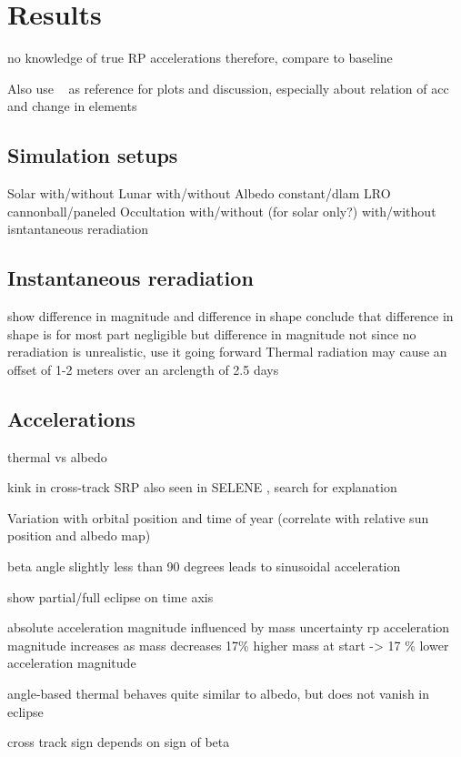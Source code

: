 \section{Results}

no knowledge of true RP accelerations
therefore, compare to baseline

Also use ~\cite{Borderies1990} as reference for plots and discussion, especially about relation of acc and change in elements

\subsection{Simulation setups}

Solar with/without
Lunar with/without
Albedo constant/dlam
LRO cannonball/paneled
Occultation with/without (for solar only?)
with/without isntantaneous reradiation

\subsection{Instantaneous reradiation}
show difference in magnitude and difference in shape
conclude that difference in shape is for most part negligible but difference in magnitude not
since no reradiation is unrealistic, use it going forward
Thermal radiation may cause an offset of 1-2 meters over an arclength of 2.5 days~\cite{Bauer2016}


\subsection{Accelerations}
thermal vs albedo

kink in cross-track SRP also seen in SELENE \cite{Kubooka1999}, search for explanation

Variation with orbital position and time of year (correlate with relative sun position and albedo map)

beta angle slightly less than 90 degrees leads to sinusoidal acceleration

show partial/full eclipse on time axis

absolute acceleration magnitude influenced by mass uncertainty
rp acceleration magnitude increases as mass decreases
17\% higher mass at start -> 17 \% lower acceleration magnitude

angle-based thermal behaves quite similar to albedo, but does not vanish in eclipse

cross track sign depends on sign of beta

